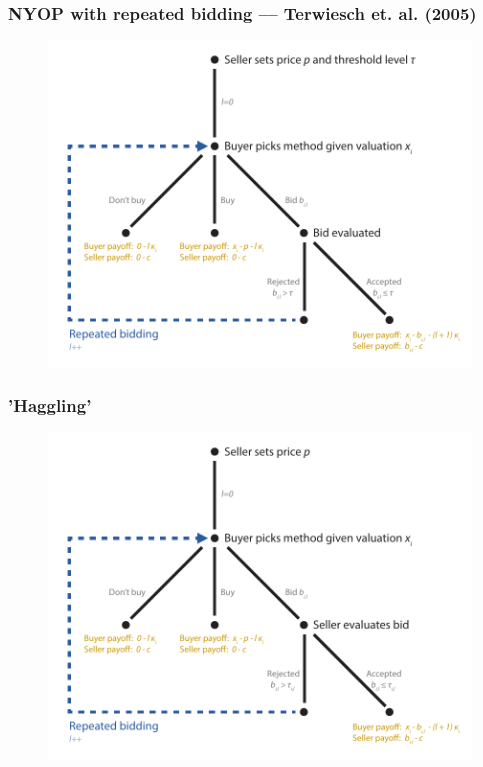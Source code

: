 \documentclass[mathserif,serif]{beamer}
\begin{document}
	\begin{frame}
		\frametitle{NYOP with repeated bidding \small –– Terwiesch et. al. (2005)}
		\begin{figure}[plain]
			\includegraphics[width=1\textwidth]{Figures/NYOP_repeated}
		\end{figure}
	\end{frame}
	
	\begin{frame}
		\frametitle{'Haggling'}
		\begin{figure}[plain]
			\includegraphics[width=1\textwidth]{Figures/Haggling}
		\end{figure}
	\end{frame}
	
\end{document}
